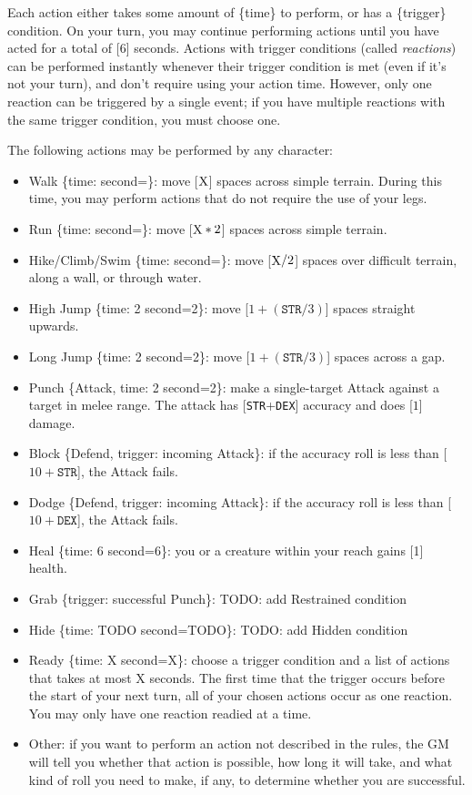 \documentclass[12pt]{article}
\newcommand{\STR}{\texttt{STR}}
\newcommand{\DEX}{\texttt{DEX}}
\newcommand{\X}{\text{{\lower 0.2mm \hbox{X}}}}
\newcommand{\TIME}[1]{\{time: #1 second\if1=#1{}\else{s}\fi\}}
\newcommand{\TRIG}[1]{\{trigger: #1\}}
\newcommand{\Attack}[1]{\{Attack, time: #1 second\if1=#1{}\else{s}\fi\}}
\newcommand{\Defend}{\{Defend, trigger: incoming Attack\}}
\begin{document}
Each action either takes some amount of \{time\} to perform, or has a \{trigger\} condition. On your turn, you may continue performing actions until you have acted for a total of [6] seconds. Actions with trigger conditions (called \textit{reactions}) can be performed instantly whenever their trigger condition is met (even if it’s not your turn), and don’t require using your action time. However, only one reaction can be triggered by a single event; if you have multiple reactions with the same trigger condition, you must choose one.

The following actions may be performed by any character:
\begin{itemize}

\item Walk \TIME{\X}: move [$\X$] spaces across simple terrain. During this time, you may perform actions that do not require the use of your legs.

\item Run \TIME{\X}: move [$\X * 2$] spaces across simple terrain.

\item Hike/Climb/Swim \TIME{\X}: move [$\X / 2$] spaces over difficult terrain, along a wall, or through water.

\item High Jump \TIME{2}: move [$1 + (\STR / 3)$] spaces straight upwards.

\item Long Jump \TIME{2}: move [$1 + (\STR / 3)$] spaces across a gap.

\item Punch \Attack{2}: make a single-target Attack against a target in melee range. The attack has [\STR+\DEX] accuracy and does [$1$] damage.

\item Block \Defend: if the accuracy roll is less than [$10 + \STR$], the Attack fails.

\item Dodge \Defend: if the accuracy roll is less than [$10 + \DEX$], the Attack fails.

\item Heal \TIME{6}: you or a creature within your reach gains [1] health.

\item Grab \TRIG{successful Punch}: TODO: add Restrained condition

\item Hide \TIME{TODO}: TODO: add Hidden condition

\item Ready \TIME{X}: choose a trigger condition and a list of actions that takes at most X seconds. The first time that the trigger occurs before the start of your next turn, all of your chosen actions occur as one reaction. You may only have one reaction readied at a time.

\item Other: if you want to perform an action not described in the rules, the GM will tell you whether that action is possible, how long it will take, and what kind of roll you need to make, if any, to determine whether you are successful.

\end{itemize}
\end{document}
